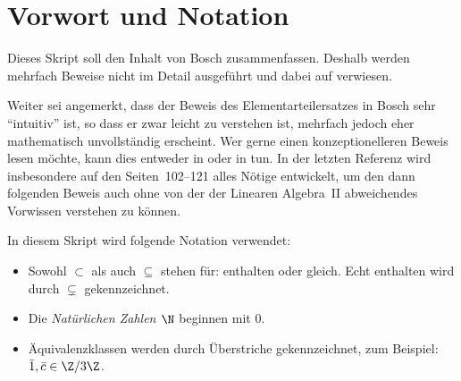
\setcounter{chapter}{-1}
\chapter{Vorwort und Notation}
Dieses Skript soll den Inhalt von Bosch\cite[S.\,206\,ff., 6.3]{bookc:bosch08}
zusammenfassen. Deshalb werden mehrfach Beweise nicht im Detail ausgeführt und
dabei auf \cite{bookc:bosch08} verwiesen.

Weiter sei angemerkt, dass der Beweis des Elementarteilersatzes in
Bosch\cite{bookc:bosch08} sehr \enquote{intuitiv} ist, so dass er zwar leicht zu
verstehen ist, mehrfach jedoch eher mathematisch unvollständig erscheint.
Wer gerne einen konzeptionelleren Beweis lesen möchte, kann dies entweder in
\cite[Kap.~7]{lecnotes:gub:alg2} oder in \cite[Kap.~22]{lecnotes:jan:la2} tun.
In der letzten Referenz wird insbesondere auf den Seiten~102--121 alles Nötige
entwickelt, um den dann folgenden Beweis auch ohne von der der Linearen Algebra~II
abweichendes Vorwissen verstehen zu können.

\bigskip
In diesem Skript wird folgende Notation verwendet:
\begin{itemize}
    \item
        Sowohl $\subset$ als auch $\subseteq$ stehen für: enthalten oder gleich.
        Echt enthalten wird durch $\subsetneq$ gekennzeichnet.

    \item
        Die \emph{Natürlichen Zahlen $\N$} beginnen mit $0$.

    \item
        Äquivalenzklassen werden durch Überstriche gekennzeichnet, zum Beispiel:
        $\bar 1, \bar c \in \Z/3\Z$.
\end{itemize}

